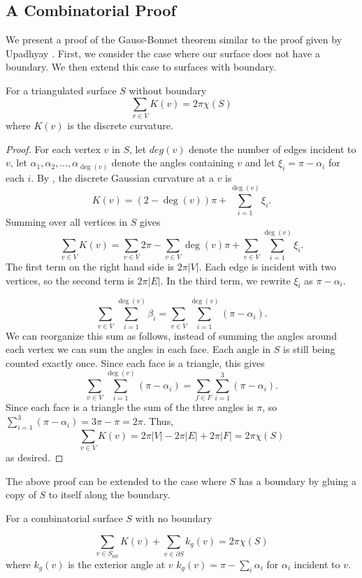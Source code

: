 \subsection{A Combinatorial Proof}
\label{sec:proof}


We present a proof of the Gauss-Bonnet theorem similar to the proof given by Upadhyay \cite{upadhyay2015}.
First, we consider the case where our surface does not have a boundary.
We then extend this case to surfaces with boundary.
\begin{theorem}\label{thm:g-b-discete-bdy}
For a triangulated surface $S$ without boundary
$$\sum_{v\in V} K(v)=2\pi \chi(S)$$
where $K(v)$ is the discrete curvature.
\end{theorem}

\begin{proof}

For each vertex $v$ in $S$,
let $deg(v)$ denote the number of edges incident to $v$, let $\alpha_1,\alpha_2,\ldots,\alpha_{\deg{(v)}}$ denote the angles
containing $v$ and let $\xi_i=\pi-\alpha_i$ for each $i$.
By , 
the discrete Gaussian curvature at a $v$ is
 $$K(v)=(2-\deg{(v)})\pi +\sum_{i=1}^{\deg{(v)}} \xi_i.$$
Summing over all vertices in $S$ gives
$$\sum_{v\in V} K(v)=\sum_{v\in V}2\pi - \sum_{v\in V}\deg{(v)}\pi+\sum_{v\in V}\sum_{i=1}^{\deg{(v)}} \xi_i.$$
The first term on the right hand side is $2\pi |V|$. Each edge is incident with two vertices, so the second term is $2\pi |E|$. 
In the third term, we rewrite $\xi_i$ as $\pi-\alpha_i$.

$$ \sum_{v\in V}\sum_{i=1}^{\deg{(v)}} \beta_i= \sum_{v\in V}\sum_{i=1}^{\deg{(v)}} (\pi-\alpha_i).$$
We can reorganize this sum as follows, instead of summing the angles around each vertex we can sum the angles in each face.
Each angle in $S$ is still being counted exactly once. 
Since each face is a triangle, this gives
$$\sum_{v\in V}\sum_{i=1}^{\deg{(v)}} (\pi-\alpha_i)=\sum_{f\in F}\sum_{i=1}^3(\pi-\alpha_i).$$
Since each face is a triangle the sum of the three angles is $\pi$,
so $\sum_{i=1}^3(\pi-\alpha_i)=3\pi-\pi=2\pi.$
Thus, $$\sum_{v\in V} K(v)=2\pi |V|-2\pi |E|+2\pi |F|=2\pi \chi(S)$$ as desired.
\end{proof}

The above proof can be extended to the case where $S$ has a boundary
by gluing a copy of $S$ to itself along the boundary.

\begin{theorem}\label{thm:g-b-discete}
For a combinatorial surface $S$ with no boundary

$$\sum_{v\in S_{\text{int}}} K(v)+\sum_{v\in\partial S}k_g(v)=2\pi \chi(S)$$
where $k_g(v)$ is the exterior angle at $v$ 
$k_g(v)=\pi-\sum_i\alpha_i$ for $\alpha_i$ incident to $v$.
\end{theorem}

